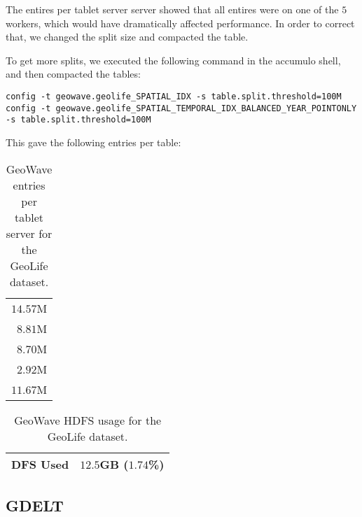 

The entires per tablet server server showed that all entires were on one of the $5$ workers, which would have dramatically affected performance.
In order to correct that, we changed the split size and compacted the table.

To get more splits, we executed the following command in the accumulo shell, and then compacted the tables:

\begin{verbatim}
config -t geowave.geolife_SPATIAL_IDX -s table.split.threshold=100M
config -t geowave.geolife_SPATIAL_TEMPORAL_IDX_BALANCED_YEAR_POINTONLY -s table.split.threshold=100M
\end{verbatim}

This gave the following entries per table:

\begin{table}[htb]
  \centering
  \begin{tabular}{ | r | }
    \hline
    $14.57$M \\
    $8.81$M \\
    $8.70$M \\
    $2.92$M \\
    $11.67$M \\
    \hline
  \end{tabular}
  \caption{GeoWave entries per tablet server for the GeoLife dataset.}
  \label{table:geolife:geowave:tablets}
\end{table}


\begin{table}[htb]
  \centering
  \begin{tabular}{ | l | l | }
    \hline
    DFS Used & $12.5$GB ($1.74$\%) \\
    \hline
  \end{tabular}
  \caption{GeoWave HDFS usage for the GeoLife dataset.}
  \label{table:geolife:geowave:hdfs}
\end{table}

\subsection{GDELT}

